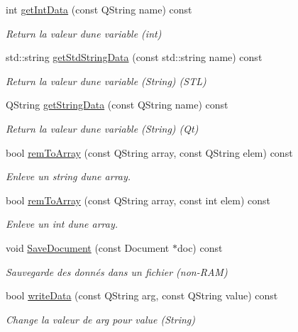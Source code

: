 \begin{DoxyCompactItemize}
int \hyperlink{classDataManager_af0c4f956eace0565b8909cdd21933da1}{get\+Int\+Data} (const Q\+String name) const
\begin{DoxyCompactList}\small\item\em Return la valeur d\textquotesingle{}une variable (int) \end{DoxyCompactList}\item 
std\+::string \hyperlink{classDataManager_a22680422b7ea8ff8fd9c7a24a47193c3}{get\+Std\+String\+Data} (const std\+::string name) const
\begin{DoxyCompactList}\small\item\em Return la valeur d\textquotesingle{}une variable (String) (S\+TL) \end{DoxyCompactList}\item 
Q\+String \hyperlink{classDataManager_adcb9caff55a85e95a70b07a157ff10ce}{get\+String\+Data} (const Q\+String name) const
\begin{DoxyCompactList}\small\item\em Return la valeur d\textquotesingle{}une variable (String) (Qt) \end{DoxyCompactList}\item 
bool \hyperlink{classDataManager_a81de7a40c5c5184c57de175d38d20ec6}{rem\+To\+Array} (const Q\+String array, const Q\+String elem) const
\begin{DoxyCompactList}\small\item\em Enleve un string d\textquotesingle{}une array. \end{DoxyCompactList}\item 
bool \hyperlink{classDataManager_ae8c8beec1b0da3b56c08b988e7c0cf09}{rem\+To\+Array} (const Q\+String array, const int elem) const
\begin{DoxyCompactList}\small\item\em Enleve un int d\textquotesingle{}une array. \end{DoxyCompactList}\item 
void \hyperlink{classDataManager_a220fa849736606675492bf57f41241a1}{Save\+Document} (const Document $\ast$doc) const
\begin{DoxyCompactList}\small\item\em Sauvegarde des donnés dans un fichier (non-\/\+R\+AM) \end{DoxyCompactList}\item 
bool \hyperlink{classDataManager_af1b5561cf95f40969d9cb44b0d01a835}{write\+Data} (const Q\+String arg, const Q\+String value) const
\begin{DoxyCompactList}\small\item\em Change la valeur de arg pour value (String) \end{DoxyCompactList}\item 

\end{DoxyCompactItemize}
